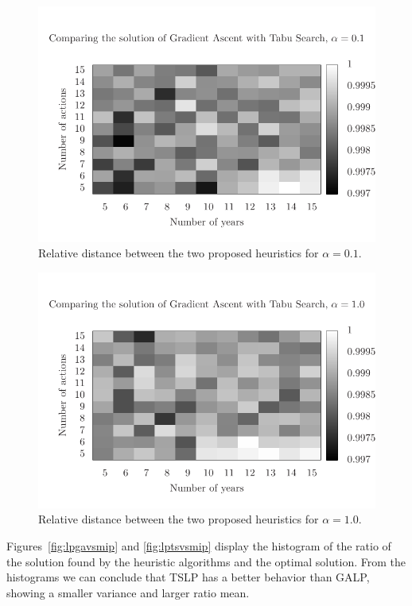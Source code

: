 \begin{figure}
\centering
\includegraphics[scale=0.73, trim=0.75cm 0cm 0 2cm, clip=true]{imgs/comp_hard_sg_ts.pdf}
\caption{Relative distance between the two proposed heuristics for $\alpha=0.1$.}
\label{fig:comp_2}
\end{figure}

\begin{figure}
\centering
\includegraphics[scale=0.73, trim=0.75cm 0cm 0 2cm, clip=true]{imgs/comp_easy_sg_ts.pdf}
\caption{Relative distance between the two proposed heuristics for $\alpha=1.0$.}
\label{fig:comp_3}
\end{figure}

Figures~\ref{fig:lpgavsmip} and \ref{fig:lptsvsmip} display the histogram of
the ratio of the solution found by the heuristic algorithms and the optimal solution.
From the histograms we can conclude that TSLP has a better behavior than GALP,
showing a smaller variance and larger ratio mean.

